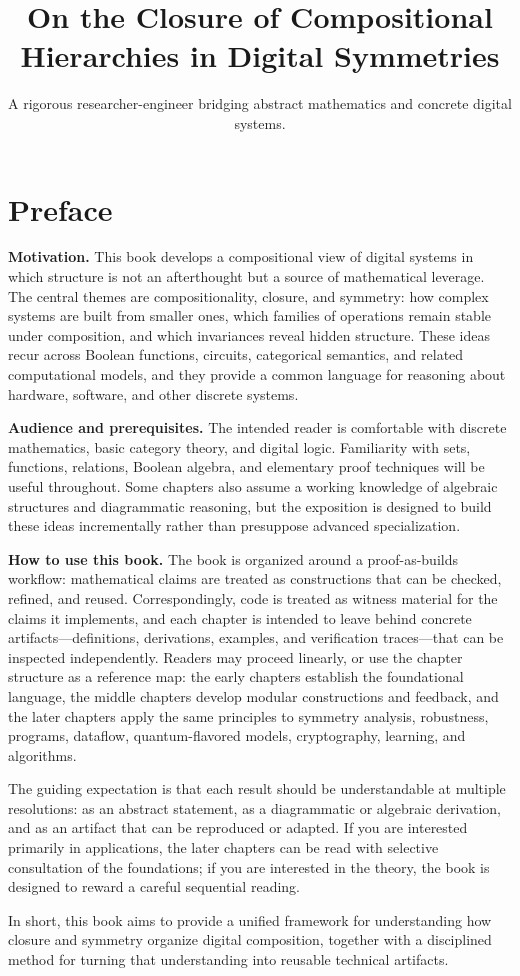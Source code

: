 \documentclass[11pt]{article}
\title{On the Closure of Compositional Hierarchies in Digital Symmetries}
\author{A rigorous researcher-engineer bridging abstract mathematics and concrete digital systems.}
\begin{document}
\section*{Preface}

\noindent\textbf{Motivation.} This book develops a compositional view of digital systems in which structure is not an afterthought but a source of mathematical leverage. The central themes are compositionality, closure, and symmetry: how complex systems are built from smaller ones, which families of operations remain stable under composition, and which invariances reveal hidden structure. These ideas recur across Boolean functions, circuits, categorical semantics, and related computational models, and they provide a common language for reasoning about hardware, software, and other discrete systems.

\medskip
\noindent\textbf{Audience and prerequisites.} The intended reader is comfortable with discrete mathematics, basic category theory, and digital logic. Familiarity with sets, functions, relations, Boolean algebra, and elementary proof techniques will be useful throughout. Some chapters also assume a working knowledge of algebraic structures and diagrammatic reasoning, but the exposition is designed to build these ideas incrementally rather than presuppose advanced specialization.

\medskip
\noindent\textbf{How to use this book.} The book is organized around a proof-as-builds workflow: mathematical claims are treated as constructions that can be checked, refined, and reused. Correspondingly, code is treated as witness material for the claims it implements, and each chapter is intended to leave behind concrete artifacts---definitions, derivations, examples, and verification traces---that can be inspected independently. Readers may proceed linearly, or use the chapter structure as a reference map: the early chapters establish the foundational language, the middle chapters develop modular constructions and feedback, and the later chapters apply the same principles to symmetry analysis, robustness, programs, dataflow, quantum-flavored models, cryptography, learning, and algorithms.

\medskip
\noindent The guiding expectation is that each result should be understandable at multiple resolutions: as an abstract statement, as a diagrammatic or algebraic derivation, and as an artifact that can be reproduced or adapted. If you are interested primarily in applications, the later chapters can be read with selective consultation of the foundations; if you are interested in the theory, the book is designed to reward a careful sequential reading.

\medskip
\noindent In short, this book aims to provide a unified framework for understanding how closure and symmetry organize digital composition, together with a disciplined method for turning that understanding into reusable technical artifacts.
\end{document}

